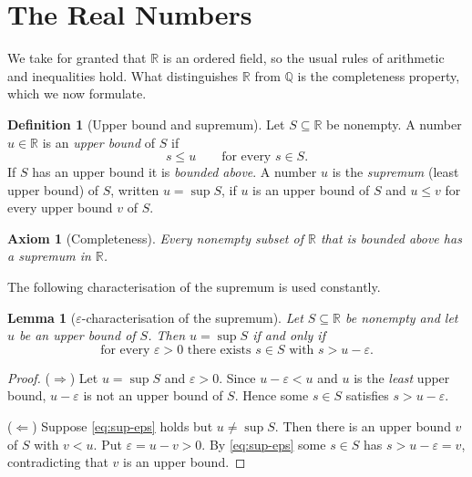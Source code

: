 \documentclass[11pt,a4paper]{book}
\newcommand{\Q}{\mathbb{Q}}
\newcommand{\R}{\mathbb{R}}
\numberwithin{equation}{section}          %
\theoremstyle{plain}
\newtheorem{lemma}[theorem]{Lemma}
\newtheorem{axiom}[theorem]{Axiom}
\theoremstyle{definition}
\newtheorem{definition}[theorem]{Definition}
\theoremstyle{remark}
\begin{document}
\section{The Real Numbers}\label{sec:real-numbers}

We take for granted that $\R$ is an ordered field, so the usual rules of arithmetic and inequalities hold. What distinguishes $\R$ from $\Q$ is the completeness property, which we now formulate.

\begin{definition}[Upper bound and supremum]\label{def:sup}
Let $S\subseteq\R$ be nonempty. A number $u\in\R$ is an \emph{upper bound} of $S$ if
\begin{equation}\label{eq:upper-bound}
    s\le u\qquad\text{for every } s\in S.
\end{equation}
If $S$ has an upper bound it is \emph{bounded above}. A number $u$ is the \emph{supremum} (least upper bound) of $S$, written $u=\sup S$, if $u$ is an upper bound of $S$ and $u\le v$ for every upper bound $v$ of $S$.
\end{definition}

\begin{axiom}[Completeness]\label{ax:completeness}
Every nonempty subset of $\R$ that is bounded above has a supremum in $\R$.
\end{axiom}

The following characterisation of the supremum is used constantly.

\begin{lemma}[$\varepsilon$-characterisation of the supremum]\label{lem:sup-eps}
Let $S\subseteq\R$ be nonempty and let $u$ be an upper bound of $S$. Then $u=\sup S$ if and only if
\begin{equation}\label{eq:sup-eps}
    \text{for every } \varepsilon>0 \text{ there exists } s\in S \text{ with } s>u-\varepsilon.
\end{equation}
\end{lemma}

\begin{proof}
($\Rightarrow$) Let $u=\sup S$ and $\varepsilon>0$. Since $u-\varepsilon<u$ and $u$ is the \emph{least} upper bound, $u-\varepsilon$ is not an upper bound of $S$. Hence some $s\in S$ satisfies $s>u-\varepsilon$.

($\Leftarrow$) Suppose \eqref{eq:sup-eps} holds but $u\ne\sup S$. Then there is an upper bound $v$ of $S$ with $v<u$. Put $\varepsilon=u-v>0$. By \eqref{eq:sup-eps} some $s\in S$ has $s>u-\varepsilon=v$, contradicting that $v$ is an upper bound.
\end{proof}
\end{document}
